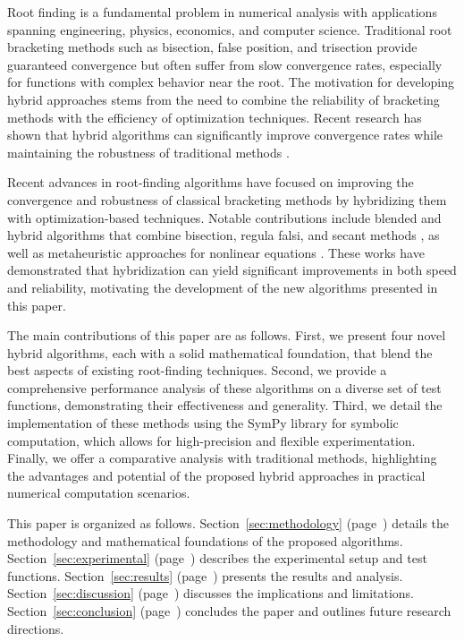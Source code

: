 \documentclass[amsmath, amssymb, aps]{revtex4-2}
\begin{document}
Root finding is a fundamental problem in numerical analysis with applications spanning engineering, physics, economics, and computer science. Traditional root bracketing methods such as bisection, false position, and trisection provide guaranteed convergence but often suffer from slow convergence rates, especially for functions with complex behavior near the root. The motivation for developing hybrid approaches stems from the need to combine the reliability of bracketing methods with the efficiency of optimization techniques. Recent research has shown that hybrid algorithms can significantly improve convergence rates while maintaining the robustness of traditional methods \cite{sabharwal2019blended, badr2022novel}.

Recent advances in root-finding algorithms have focused on improving the convergence and robustness of classical bracketing methods by hybridizing them with optimization-based techniques. Notable contributions include blended and hybrid algorithms that combine bisection, regula falsi, and secant methods \cite{sabharwal2019hybrid, badr2021comparative}, as well as metaheuristic approaches for nonlinear equations \cite{thota2019trigonometrical, hasan2016numerical}. These works have demonstrated that hybridization can yield significant improvements in both speed and reliability, motivating the development of the new algorithms presented in this paper.

The main contributions of this paper are as follows. First, we present four novel hybrid algorithms, each with a solid mathematical foundation, that blend the best aspects of existing root-finding techniques. Second, we provide a comprehensive performance analysis of these algorithms on a diverse set of test functions, demonstrating their effectiveness and generality. Third, we detail the implementation of these methods using the SymPy library for symbolic computation, which allows for high-precision and flexible experimentation. Finally, we offer a comparative analysis with traditional methods, highlighting the advantages and potential of the proposed hybrid approaches in practical numerical computation scenarios.

This paper is organized as follows. Section~\ref{sec:methodology} (page~\pageref{sec:methodology}) details the methodology and mathematical foundations of the proposed algorithms. Section~\ref{sec:experimental} (page~\pageref{sec:experimental}) describes the experimental setup and test functions. Section~\ref{sec:results} (page~\pageref{sec:results}) presents the results and analysis. Section~\ref{sec:discussion} (page~\pageref{sec:discussion}) discusses the implications and limitations. Section~\ref{sec:conclusion} (page~\pageref{sec:conclusion}) concludes the paper and outlines future research directions.
\end{document}
